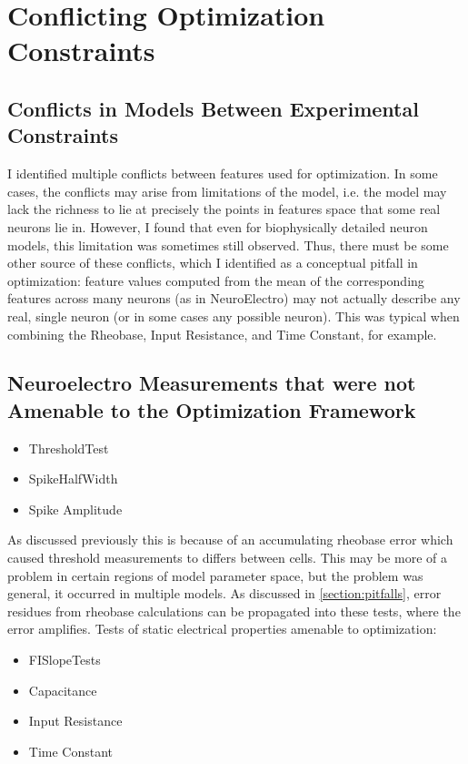 \section{Conflicting Optimization Constraints}

\subsection{Conflicts in Models Between Experimental Constraints}

I identified multiple conflicts between features used for optimization.
In some cases, the conflicts may arise from limitations of the model, i.e. the model may lack the richness to lie at precisely the points in features space that some real neurons lie in.
However, I found that even for biophysically detailed neuron models, this limitation was sometimes still observed.
Thus, there must be some other source of these conflicts, which I identified as a conceptual pitfall in optimization: feature values computed from the mean of the corresponding features across many neurons (as in NeuroElectro) may not actually describe any real, single neuron (or in some cases any possible neuron). 
This was typical when combining the Rheobase, Input Resistance, and Time Constant, for example.

\subsection{Neuroelectro Measurements that were not Amenable to the Optimization Framework}
\begin{itemize}
\item ThresholdTest
\item SpikeHalfWidth
\item Spike Amplitude
\end{itemize}
As discussed previously this is because of an accumulating rheobase error which caused threshold measurements to differs between cells. This may be more of a problem in certain regions of model parameter space, but the problem was general, it occurred in multiple models. As discussed in \ref{section:pitfalls}, error residues from rheobase calculations can be propagated into these tests, where the error amplifies.
Tests of static electrical properties amenable to optimization:
\begin{itemize}
\item FISlopeTests
\item Capacitance
\item Input Resistance
\item Time Constant 
\end{itemize}

